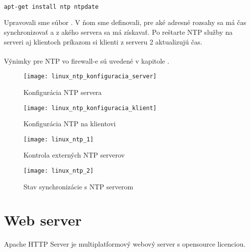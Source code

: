 \noindent
{\selectfont
\begin{small}
\begin{verbatim}

apt-get install ntp ntpdate

\end{verbatim}
\end{small}
}

Upravovali sme súbor . V ňom sme definovali, pre aké adresné rozsahy sa má čas synchronizovať a z akého servera sa má získavať. Po reštarte NTP služby na serveri aj klientoch príkazom  si klienti z serveru 2 aktualizujú čas.

\paragraph{}
Výnimky pre NTP vo firewall-e sú uvedené v kapitole .

\begin{figure}[!htb]
\centering
\texttt{[image: linux\_ntp\_konfiguracia\_server]}
\caption{Konfigurácia NTP servera}
\label{fig:ntp_config_server}
\end{figure}

\begin{figure}[!htb]
\centering
\texttt{[image: linux\_ntp\_konfiguracia\_klient]}
\caption{Konfigurácia NTP na klientovi}
\label{fig:ntp_config_client}
\end{figure}

\begin{figure}[!htb]
\centering
\texttt{[image: linux\_ntp\_1]}
\caption{Kontrola externých NTP serverov}
\label{fig:ntp_config_valid_1}
\end{figure}

\begin{figure}[!htb]
\centering
\texttt{[image: linux\_ntp\_2]}
\caption{Stav synchronizácie s NTP serverom}
\label{fig:ntp_config_valid_2}
\end{figure}

\section{Web server}
\paragraph{}
Apache HTTP Server je multiplatformový webový server s opensource licenciou.

